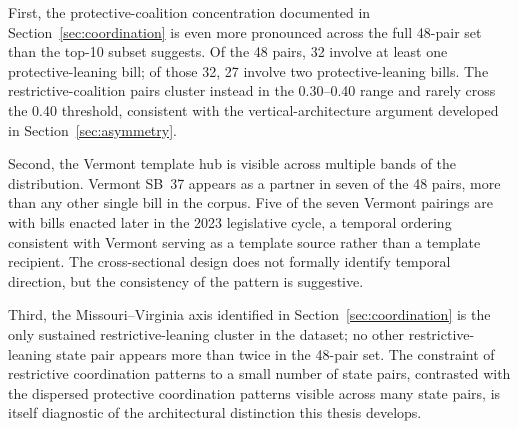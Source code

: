 \documentclass[12pt]{report}
\begin{document}
First, the protective-coalition concentration documented in Section~\ref{sec:coordination} is
even more pronounced across the full 48-pair set than the top-10 subset suggests. Of
the 48 pairs, 32 involve at least one protective-leaning bill; of those 32, 27 involve
two protective-leaning bills. The restrictive-coalition pairs cluster instead in the
0.30--0.40 range and rarely cross the 0.40 threshold, consistent with the
vertical-architecture argument developed in Section~\ref{sec:asymmetry}.

Second, the Vermont template hub is visible across multiple bands of the distribution.
Vermont SB~37 appears as a partner in seven of the 48 pairs, more than any other single
bill in the corpus. Five of the seven Vermont pairings are with bills enacted later in
the 2023 legislative cycle, a temporal ordering consistent with Vermont serving as a
template source rather than a template recipient. The cross-sectional design does not
formally identify temporal direction, but the consistency of the pattern is suggestive.

Third, the Missouri--Virginia axis identified in Section~\ref{sec:coordination} is the only
sustained restrictive-leaning cluster in the dataset; no other restrictive-leaning
state pair appears more than twice in the 48-pair set. The constraint of restrictive
coordination patterns to a small number of state pairs, contrasted with the dispersed
protective coordination patterns visible across many state pairs, is itself diagnostic
of the architectural distinction this thesis develops.
\end{document}
